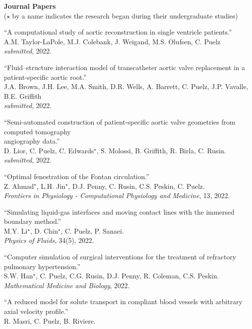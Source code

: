 \documentclass{article} %
\begin{document}
\vspace{0.5cm}
\noindent
{\bf \large Journal Papers}\\
{\footnotesize($\star$ by a name indicates the research began during their undergraduate studies)}
\begin{etaremune}
\item ``A computational study of aortic reconstruction in single ventricle patients.'' \\
A.M. Taylor-LaPole, M.J. Colebank, J. Weigand, M.S. Olufsen, C. Puelz \\
{\em submitted}, 2022.
\item ``Fluid–structure interaction model of transcatheter aortic valve replacement in a patient-specific aortic root.'' \\
J.A. Brown, J.H. Lee, M.A. Smith, D.R. Wells, A. Barrett, C. Puelz, J.P. Vavalle, B.E. Griffith \\
{\em submitted}, 2022.
\item ``Semi-automated construction of patient-specific aortic valve geometries from computed tomography\\ angiography data.'' \\
D. Lior, C. Puelz, C. Edwards$^\star$, S. Molossi, B. Griffith, R. Birla, C. Rusin. \\
{\em submitted}, 2022.
\item ``Optimal fenestration of the Fontan circulation.'' \\
Z. Ahmad$^\star$, L.H. Jin$^\star$, D.J. Penny, C. Rusin, C.S. Peskin, C. Puelz. \\
{\em Frontiers in Physiology - Computational Physiology and Medicine}, 13, 2022.
\item ``Simulating liquid-gas interfaces and moving contact lines with the immersed boundary method.'' \\
M.Y. Li$^\star$, D. Chin$^\star$, C. Puelz, P. Sanaei. \\
{\em Physics of Fluids}, 34(5), 2022.
\item ``Computer simulation of surgical interventions for the treatment of refractory pulmonary hypertension.'' \\
S.W. Han$^\star$, C. Puelz, C.G. Rusin, D.J. Penny, R. Coleman, C.S. Peskin. \\
{\em Mathematical Medicine and Biology}, 2022.
\item ``A reduced model for solute transport in compliant blood vessels with arbitrary axial velocity profile.'' \\
R. Masri, C. Puelz, B. Riviere. \\

\end{etaremune}
\end{document}
